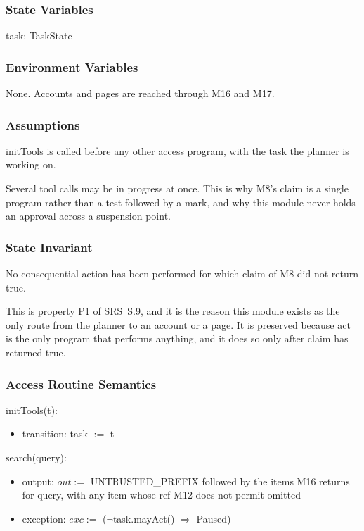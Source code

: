 \documentclass[12pt, titlepage]{article}
\begin{document}
\subsubsection{State Variables}

task: TaskState

\subsubsection{Environment Variables}

None. Accounts and pages are reached through M16 and M17.

\subsubsection{Assumptions}

initTools is called before any other access program, with the task the planner
is working on.

\noindent Several tool calls may be in progress at once. This is why M8's claim
is a single program rather than a test followed by a mark, and why this module
never holds an approval across a suspension point.

\subsubsection{State Invariant}

No consequential action has been performed for which claim of M8 did not return
true.

\noindent This is property P1 of SRS~S.9, and it is the reason this module
exists as the only route from the planner to an account or a page. It is
preserved because act is the only program that performs anything, and it does
so only after claim has returned true.

\subsubsection{Access Routine Semantics}

\noindent initTools(t):
\begin{itemize}
\item transition: task $:=$ t
\end{itemize}

\noindent search(query):
\begin{itemize}
\item output: $out :=$ UNTRUSTED\_PREFIX followed by the items M16 returns for
query, with any item whose ref M12 does not permit omitted
\item exception: $exc :=$ ($\lnot$task.mayAct() $\Rightarrow$ Paused)
\end{itemize}
\end{document}
